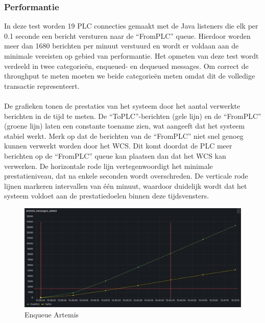 \subsubsection{Performantie}
In deze test worden 19 PLC connecties gemaakt met de Java listeners die elk per 0.1 seconde een bericht versturen naar de ``FromPLC'' queue.
Hierdoor worden meer dan 1680 berichten per minuut verstuurd en wordt er voldaan aan de minimale vereisten op gebied van performantie.
Het opmeten van deze test wordt verdeeld in twee categorieën, enqueued- en dequeued messages.
Om correct de throughput te meten moeten we beide categorieën meten omdat dit de volledige transactie representeert. 
\\\\
De grafieken tonen de prestaties van het systeem door het aantal verwerkte berichten in de tijd te meten.
De ``ToPLC''-berichten (gele lijn) en de ``FromPLC'' (groene lijn) laten een constante toename zien, wat aangeeft dat het systeem stabiel werkt. 
Merk op dat de berichten van de ``FromPLC'' niet snel genoeg kunnen verwerkt worden door het WCS. Dit komt doordat de PLC meer berichten op de ``FromPLC'' queue kan plaatsen dan dat het WCS kan verwerken.
De horizontale rode lijn vertegenwoordigt het minimale prestatieniveau, dat na enkele seconden wordt overschreden. 
De verticale rode lijnen markeren intervallen van één minuut, waardoor duidelijk wordt dat het systeem voldoet 
aan de prestatiedoelen binnen deze tijdsvensters.
\newpage
\begin{figure}[h!]
  \centering
  \includegraphics[width=.95\textwidth]{img/artemis-enqueue-count.png}
  \caption{\label{fig:artemis_enqueue_count}Enqueue Artemis}
\end{figure}

